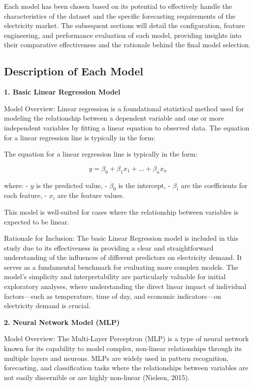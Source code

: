 \documentclass[mstat,12pt]{unswthesis}
\begin{document}
Each model has been chosen based on its potential to effectively handle
the characteristics of the dataset and the specific forecasting
requirements of the electricity market. The subsequent sections will
detail the configuration, feature engineering, and performance
evaluation of each model, providing insights into their comparative
effectiveness and the rationale behind the final model selection.

\subsection{Description of Each Model}\label{description-of-each-model}

\textbf{1. Basic Linear Regression Model}

Model Overview: Linear regression is a foundational statistical method
used for modeling the relationship between a dependent variable and one
or more independent variables by fitting a linear equation to observed
data. The equation for a linear regression line is typically in the
form:

The equation for a linear regression line is typically in the form:

\[ y = \beta_0 + \beta_1 x_1 + \dots + \beta_n x_n \]

where: - \(y\) is the predicted value, - \(\beta_0\) is the intercept, -
\(\beta_i\) are the coefficients for each feature, - \(x_i\) are the
feature values.

This model is well-suited for cases where the relationship between
variables is expected to be linear.

Rationale for Inclusion: The basic Linear Regression model is included
in this study due to its effectiveness in providing a clear and
straightforward understanding of the influences of different predictors
on electricity demand. It serves as a fundamental benchmark for
evaluating more complex models. The model's simplicity and
interpretability are particularly valuable for initial exploratory
analyses, where understanding the direct linear impact of individual
factors---such as temperature, time of day, and economic indicators---on
electricity demand is crucial.

\textbf{2. Neural Network Model (MLP)}

Model Overview: The Multi-Layer Perceptron (MLP) is a type of neural
network known for its capability to model complex, non-linear
relationships through its multiple layers and neurons. MLPs are widely
used in pattern recognition, forecasting, and classification tasks where
the relationships between variables are not easily discernible or are
highly non-linear (Nielsen, 2015).
\end{document}
